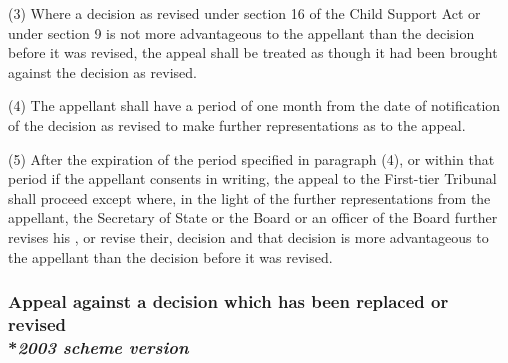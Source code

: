 \documentclass[12pt,a4paper]{article}
\begin{document}
(3) Where a decision as revised under section 16 of the Child Support Act or under section 9 is not more advantageous to the appellant than the decision before it was revised, the appeal shall be treated as though it had been brought against the decision as revised.

(4) The appellant shall have a period of one month from the date of notification of the decision as revised to make further representations as to the appeal.

(5) After the expiration of the period specified in paragraph (4), or within that period if the appellant consents in writing, the appeal to the 
First-tier Tribunal  %
shall proceed except where, in the light of the further representations from the appellant, the Secretary of State
or the Board or an officer of the Board  %
further revises his%
, or revise their,  %
decision and that decision is more advantageous to the appellant than the decision before it was revised.


\subsubsection[30. Appeal against a decision which has been replaced or revised --- \emph{2003 scheme version}]{Appeal against a decision which has been replaced or revised\\*\emph{2003 scheme version}}
\end{document}
